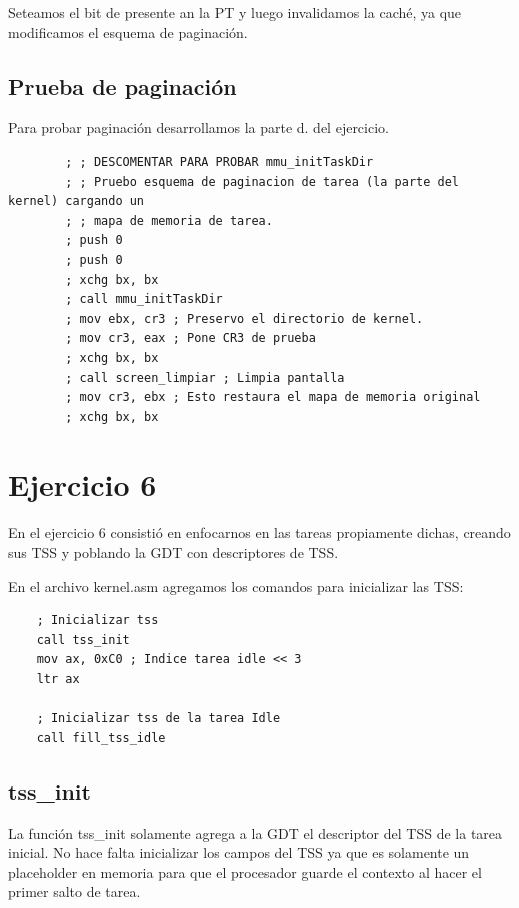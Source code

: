 \documentclass[a4paper]{article}
\newenvironment{codesnippet}{%
	\begin{Sbox}\begin{minipage}{\textwidth}\sffamily\small}%
	{\end{minipage}\end{Sbox}%
		\begin{center}%
		\vspace{-0.4cm}\colorbox{litegrey}{\TheSbox}\end{center}\vspace{0.3cm}}
\begin{document}
Seteamos el bit de presente an la PT y luego invalidamos la caché, ya que modificamos el esquema de paginación.


\subsection{Prueba de paginación}

Para probar paginación desarrollamos la parte d. del ejercicio.

\begin{codesnippet}
  \begin{verbatim}
	    ; ; DESCOMENTAR PARA PROBAR mmu_initTaskDir
	    ; ; Pruebo esquema de paginacion de tarea (la parte del kernel) cargando un
	    ; ; mapa de memoria de tarea.
	    ; push 0
	    ; push 0
	    ; xchg bx, bx
	    ; call mmu_initTaskDir
	    ; mov ebx, cr3 ; Preservo el directorio de kernel.
	    ; mov cr3, eax ; Pone CR3 de prueba
	    ; xchg bx, bx
	    ; call screen_limpiar ; Limpia pantalla
	    ; mov cr3, ebx ; Esto restaura el mapa de memoria original
	    ; xchg bx, bx
  \end{verbatim}
\end{codesnippet}

\section{Ejercicio 6}

En el ejercicio 6 consistió en enfocarnos en las tareas propiamente dichas, creando sus TSS y poblando la GDT con
descriptores de TSS.


En el archivo kernel.asm agregamos los comandos para inicializar las TSS:

\begin{codesnippet}
  \begin{verbatim}
    ; Inicializar tss
    call tss_init
    mov ax, 0xC0 ; Indice tarea idle << 3
    ltr ax

    ; Inicializar tss de la tarea Idle
    call fill_tss_idle
  \end{verbatim}
\end{codesnippet}

\subsection{tss_init}
La función tss_init solamente agrega a la GDT el descriptor del TSS de la tarea inicial. No hace falta inicializar los
campos del TSS ya que es solamente un placeholder en memoria para que el procesador guarde el contexto al hacer el
primer salto de tarea.
\end{document}
